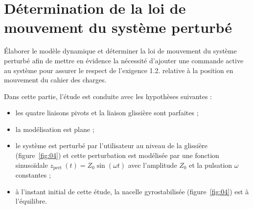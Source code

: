 
\section{\label{part:3}Détermination de la loi de mouvement du système perturbé }
\begin{obj}
Élaborer le modèle dynamique et déterminer la loi de mouvement du système perturbé afin de mettre en évidence la nécessité d'ajouter une commande active au système pour assurer le respect de l'exigence 1.2. relative à la position en mouvement du cahier des charges.
\end{obj}

\ifprof
\else
Dans cette partie, l'étude est conduite avec les hypothèses suivantes :

\begin{itemize}
  \item les quatre liaisons pivots et la liaison glissière sont parfaites ;
  \item la modélisation est plane ;
  \item le système est perturbé par l'utilisateur au niveau de la glissière (figure~\ref{fig:04}) et cette perturbation est modélisée par une fonction sinusoïdale $z_{\text {pert }}(t)=Z_{0} \sin (\omega t)$ avec l'amplitude $Z_{0}$ et la pulsation $\omega$ constantes ;
  \item à l'instant initial de cette étude, la nacelle gyrostabilisée (figure~\ref{fig:04}) est à l'équilibre.
\end{itemize}
\fi

